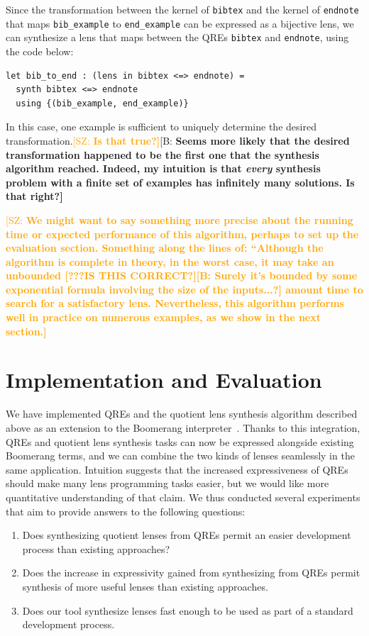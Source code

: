 \documentclass[acmsmall,review,anonymous]{acmart}
\newcommand{\FINISH}[3]{\ifdraft\textcolor{#1}{[#2: #3]}\fi}
\newcommand{\bcp}[1]{\FINISH{dkred}{B}{#1}}
\newcommand{\BCP}[1]{\FINISH{dkred}{B}{\bf #1}}
\newcommand{\SAZ}[1]{\FINISH{orange}{SZ}{\bf #1}}
\newcommand{\cd}[1]{\lstinline[backgroundcolor=\color{white}]$#1$}
\begin{document}
Since the transformation between the kernel of \cd{bibtex} and the kernel of
\cd{endnote} that maps \cd{bib_example} to \cd{end_example} can be
expressed as a bijective lens, we can synthesize a lens that maps between the
QREs \cd{bibtex} and \cd{endnote}, using the code below:

\begin{lstlisting}
let bib_to_end : (lens in bibtex <=> endnote) = 
  synth bibtex <=> endnote
  using {(bib_example, end_example)}
\end{lstlisting}

In this case, one example is sufficient to uniquely determine the desired
transformation.\SAZ{Is that true?}\BCP{Seems more likely that the desired
  transformation happened to be the first one that the synthesis algorithm
  reached.  Indeed, my intuition is that {\em every} synthesis problem with
  a finite set of examples has infinitely many solutions.  Is that right?}

\SAZ{We might want to say something more precise about the running time or
  expected performance of this algorithm, perhaps to set up the evaluation
  section.  Something along the lines of: ``Although the algorithm is complete
  in theory, in the worst case, it may take an unbounded [???IS THIS
  CORRECT?]\bcp{Surely it's bounded by some exponential formula involving the
    size of the inputs...?} 
  amount time to search for a satisfactory lens.  Nevertheless, this algorithm
  performs well in practice on numerous examples, as we show in the next
  section.} 


\section{Implementation and Evaluation}
\label{impl}


We have implemented QREs and the quotient lens synthesis algorithm described
above as an extension to the Boomerang interpreter~\cite{Boomerang}. Thanks to this integration, QREs and quotient lens
synthesis tasks can now be expressed alongside existing Boomerang terms, and we
can combine the two kinds of lenses seamlessly in the same application.
Intuition suggests that the increased expressiveness of QREs should make many
lens programming tasks easier, but we would like more quantitative understanding
of that claim.  We thus conducted several experiments that aim to provide
answers to the following questions:

\begin{enumerate}
  \item Does synthesizing quotient lenses from QREs permit an easier development
  process than existing approaches?
  
  \item Does the increase in expressivity gained from synthesizing from QREs
  permit synthesis of more useful lenses than existing approaches.
  
  \item Does our tool synthesize lenses fast enough to be used as part of a
  standard development process.
\end{enumerate}
\end{document}
